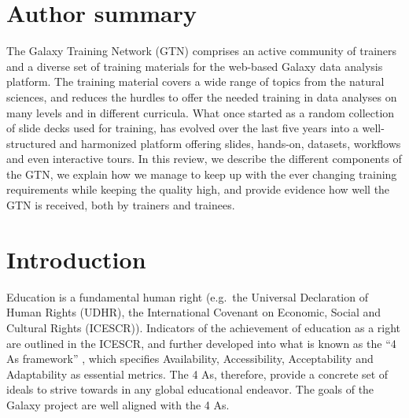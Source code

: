 \documentclass[10pt,letterpaper]{article}
\begin{document}
\section*{Author summary}
The Galaxy Training Network (GTN) comprises an active community of trainers and a diverse set of training materials for the web-based Galaxy data analysis platform. The training material covers a wide range of topics from the natural sciences, and reduces the hurdles to offer the needed training in data analyses on many levels and in different curricula. What once started as a random collection of slide decks used for training, has evolved over the last five years into a well-structured and harmonized platform offering slides, hands-on, datasets, workflows and even interactive tours. 
In this review, we describe the different components of the GTN, we explain how we manage to keep up with the ever changing training requirements while keeping the quality high, and provide evidence how well the GTN is received, both by trainers and trainees. 



\section*{Introduction}

Education is a fundamental human right (e.g.\ the Universal Declaration of Human Rights (UDHR), the International Covenant on Economic, Social and Cultural Rights (ICESCR)).
Indicators of the achievement of education as a right are outlined in the ICESCR, and further developed into what is known as the “4 As framework” \cite{tomavsevski2001human}, which specifies Availability, Accessibility, Acceptability and Adaptability as essential metrics.
The 4 As, therefore, provide a concrete set of ideals to strive towards in any global educational endeavor.
The goals of the Galaxy project are well aligned with the 4 As.
\end{document}
